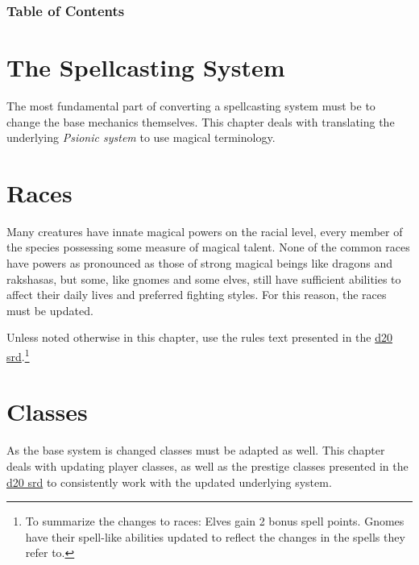 \documentclass[a4paper,10pt]{article}
\begin{document}
\section{Table of Contents}
\setlength{\columnsep}{0.5in}
\begin{multicols}{2} %
\scriptsize
\tableofcontents
\listoftables
\listoffigures
\normalsize
\end{multicols}
\newpage
\begin{multicols}{2}

\part{The Spellcasting System} %
The most fundamental part of converting a spellcasting system must be to change the base mechanics themselves. This chapter deals with translating the underlying \emph{Psionic system} to use magical terminology.
 \newpage

\part{Races}
Many creatures have innate magical powers on the racial level, every member of the species possessing some measure of magical talent. None of the common races have powers as pronounced as those of strong magical beings like dragons and rakshasas, but some, like gnomes and some elves, still have sufficient abilities to affect their daily lives and preferred fighting styles. For this reason, the races must be updated.

Unless noted otherwise in this chapter, use the rules text presented in the \href{http://www.wizards.com/default.asp?x=d20/article/srd35}{d20 srd}.\footnote{To summarize the changes to races: Elves gain 2 bonus spell points. Gnomes have their spell-like abilities updated to reflect the changes in the spells they refer to.}
 \newpage

\part{Classes}
As the base system is changed classes must be adapted as well. This chapter deals with updating player classes, as well as the prestige classes presented in the \href{http://www.wizards.com/default.asp?x=d20/article/srd35}{d20 srd} to consistently work with the updated underlying system.
 \newpage


\end{multicols}
\end{document}
